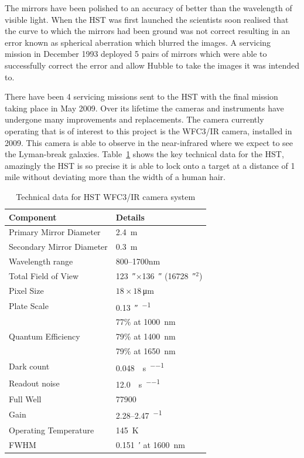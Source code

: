 		The mirrors have been polished to an accuracy of better than the wavelength of visible light. When the HST was first launched the scientists soon realised that the curve to which the mirrors had been ground was not correct resulting in an error known as spherical aberration which blurred the images. A servicing mission in December 1993 deployed 5 pairs of mirrors which were able to successfully correct the error and allow Hubble to take the images it was intended to\cite{ESA_1}.

		There have been 4 servicing missions sent to the HST with the final mission taking place in May 2009. Over its lifetime the cameras and instruments have undergone many improvements and replacements. The camera currently operating that is of interest to this project is the WFC3/IR camera, installed in 2009. This camera is able to observe in the near-infrared where we expect to see the Lyman-break galaxies. Table~\ref{tab:HST_technical} shows the key technical data for the HST, amazingly the HST is so precise it is able to lock onto a target at a distance of 1 mile without deviating more than the width of a human hair.
		\begin{table}[!htbp]
			\begin{center}
				\begin{tabular}{l|l}
					Component	& 	Details \\
					\hline\hline
					Primary Mirror Diameter & \SI{2.4}{\metre} \\ \hline
					Secondary Mirror Diameter & \SI{0.3}{\metre} \\ \hline
					Wavelength range & 800--1700\si{\nano\metre} \\ \hline
					Total Field of View & \SI{123}{\arcsecond}$\times$\SI{136}{\arcsecond} (\SI{16728}{\arcsecond}$^2$) \\ \hline
					Pixel Size & $18\times18$\,\si{\micro\metre} \\ \hline
					Plate Scale & \SI{0.13}{\arcsecond\per\pixel} \\ \hline
					\multirow{3}{*}{Quantum Efficiency} & 77\% at \SI{1000}{\nano\metre}\\
					 & 79\% at \SI{1400}{\nano\metre}\\
					 & 79\% at \SI{1650}{\nano\metre}\\ \hline
					Dark count &  \SI{0.048}{\electron\per\second\per\pixel} \\ \hline
					Readout noise & \SI{12.0}{\electron\per\second\per\pixel} \\ \hline
					Full Well & \SI{77900}{\electron} \\ \hline
					Gain & 2.28--2.47\si{\electron\per\ADU} \\ \hline
					Operating Temperature & \SI{145}{\kelvin} \\ \hline
					FWHM & \SI{0.151}{\arcminute} at \SI{1600}{\nano\metre}
				\end{tabular}
			\end{center}
			\caption{Technical data for HST WFC3/IR camera system\cite{WFC3_IHB}}
		\label{tab:HST_technical}
		\end{table}


